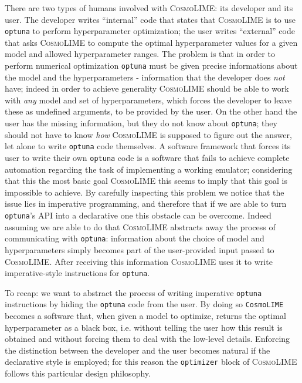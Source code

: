 There are two types of humans involved with \textsc{CosmoLIME}: its developer and its user. The developer writes ``internal'' code that states that \textsc{CosmoLIME} is to use \texttt{optuna} to perform hyperparameter optimization; the user writes ``external'' code that asks \textsc{CosmoLIME} to compute the optimal hyperparameter values for a given model and allowed hyperparameter ranges. The problem is that in order to perform numerical optimization \texttt{optuna} must be given precise informations about the model and the hyperparameters - information that the developer does \emph{not} have; indeed in order to achieve generality \textsc{CosmoLIME} should be able to work with \emph{any} model and set of hyperparameters, which forces the developer to leave these as undefined arguments, to be provided by the user. On the other hand the user has the missing information, but they do not know about \texttt{optuna}; they should not have to know \emph{how} \textsc{CosmoLIME} is supposed to figure out the answer, let alone to write \texttt{optuna} code themselves. A software framework that forces its user to write their own \texttt{optuna} code is a software that fails to achieve complete automation regarding the task of implementing a working emulator; considering that this the most basic goal \textsc{CosmoLIME} this seems to imply that this goal is impossible to achieve. By carefully inspecting this problem we notice that the issue lies in imperative programming, and therefore that if we are able to turn \texttt{optuna}'s API into a declarative one this obstacle can be overcome. Indeed assuming we are able to do that \textsc{CosmoLIME} abstracts away the process of communicating with \texttt{optuna}: information about the choice of model and hyperparameters simply becomes part of the user-provided input passed to \textsc{CosmoLIME}. After receiving this information \textsc{CosmoLIME} uses it to write imperative-style instructions for \texttt{optuna}.

To recap: we want to abstract the process of writing imperative \texttt{optuna} instructions by hiding the \texttt{optuna} code from the user. By doing so \texttt{CosmoLIME} becomes a software that, when given a model to optimize, returns the optimal hyperparameter as a black box, i.e. without telling the user how this result is obtained and without forcing them to deal with the low-level details. Enforcing the distinction between the developer and the user becomes natural if the declarative style is employed; for this reason the \texttt{optimizer} block of \textsc{CosmoLIME} follows this particular design philosophy.


